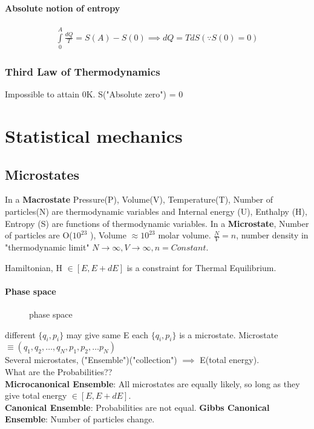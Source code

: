 \subsubsection*{Absolute notion of entropy}
\begin{gather}
    \int \limits_{0}^{A}  \frac{dQ}{T} = S(A) - S(0) \implies  dQ = T dS (\because S(0) = 0)
\end{gather}
\subsection{Third Law of Thermodynamics}
\begin{definition}
    Impossible to attain 0K. S("Absolute zero") = 0
\end{definition}
\chapter{Statistical mechanics}
\section{Microstates}
In a \textbf{Macrostate} Pressure(P), Volume(V), Temperature(T), Number of particles(N) are thermodynamic variables and Internal energy (U), Enthalpy (H), Entropy (S) are functions of thermodynamic variables.\vspace{4pt}
In a \textbf{Microstate}, Number of particles are O(\(10^{23} \) ), Volume \(\approx 10^{23} \) molar volume. \(\frac{N}{V} =n\), number density in "thermodynamic limit" \(N\to \infty , V\to \infty , n = Constant\). 
\begin{figure}[H]
    \centering
    \caption{}
    \label{fig:newbox}
\end{figure}
Hamiltonian, H \(\in [E,E+dE]\)  is a constraint for Thermal Equilibrium. 
\subsubsection*{Phase space}
\begin{figure}[H]
    \centering
    \caption{phase space}
    \label{fig:phasespace}
\end{figure}
different \(\{q_i,p_i\}\) may give same E each \(\{q_i,p_i\}\) is a microstate. 
Microstate \(\equiv (q_1,q_2,\ldots  , q_N, p_1,p_2,\ldots p_{N}  )\)\\
Several microstates, ("Ensemble")("collection") \(\implies \) E(total energy). \\
What are the Probabilities??\\
\textbf{Microcanonical Ensemble}: All microstates are equally likely, so long as they give total energy \(\in[E,E+dE]\). \\
\textbf{Canonical Ensemble}: Probabilities are not equal. 
\textbf{Gibbs Canonical Ensemble}: Number of particles change. 